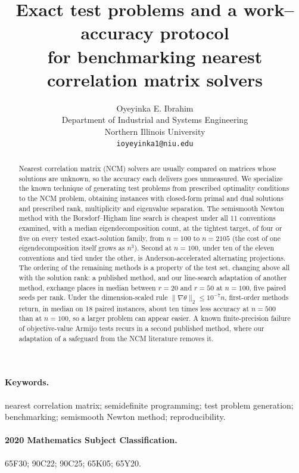 \documentclass[11pt]{article}
\title{Exact test problems and a work--accuracy protocol\\ for benchmarking nearest correlation matrix solvers}
\author{Oyeyinka E. Ibrahim \\
  Department of Industrial and Systems Engineering \\
  Northern Illinois University \\
  \texttt{ioyeyinka1@niu.edu}}
\date{}
\theoremstyle{definition}
\theoremstyle{remark}
\newcommand{\nrm}[1]{\lVert #1\rVert}
\begin{document}
\maketitle

\begin{abstract}
Nearest correlation matrix (NCM) solvers are usually compared on matrices whose
solutions are unknown, so the accuracy each delivers goes unmeasured. We
specialize the known technique of generating test problems from prescribed
optimality conditions to the NCM problem, obtaining instances with closed-form
primal and dual solutions and prescribed rank, multiplicity and
eigenvalue separation. The semismooth Newton method with the
Borsdorf--Higham line search is cheapest under all 11 conventions examined,
with a median eigendecomposition count, at the tightest target, of four or
five on every tested exact-solution family, from $n=100$ to $n=2105$ (the cost
of one eigendecomposition itself grows as $n^3$). Second
at $n=100$, under ten of the eleven conventions and tied under the other, is
Anderson-accelerated alternating projections. The ordering of the remaining
methods is a property of the test set, changing above all with the solution
rank: a published method, and our line-search adaptation of another method,
exchange places in median between $r=20$ and $r=50$ at $n=100$, five paired
seeds per rank. Under the
dimension-scaled rule
$\nrm{\nabla\theta}_2\le10^{-7}n$, first-order methods return, in median on
18 paired instances, about ten times
less accuracy at $n=500$ than at $n=100$, so a larger problem can appear
easier. A known finite-precision failure of objective-value Armijo tests
recurs in a second published method, where our adaptation of a safeguard from
the NCM literature removes it.
\end{abstract}

{\sloppy\paragraph{Keywords.} nearest correlation matrix; semidefinite programming;
test problem generation; benchmarking; semismooth Newton method;
reproducibility.\par}

\paragraph{2020 Mathematics Subject Classification.} 65F30; 90C22; 90C25;
65K05; 65Y20.











\appendix






\clearpage


\end{document}
